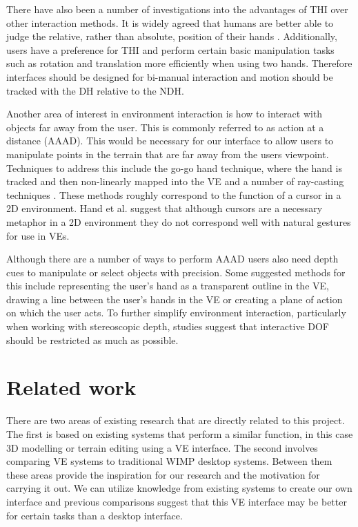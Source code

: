 \documentclass{sig-alternate-05-2015}
\begin{document}
There have also been a number of investigations into the advantages of THI over other interaction methods. It is widely agreed that humans are better able to judge the relative, rather than absolute, position of their hands \cite{Bowman1998, Buxton1986}. Additionally, users have a preference for THI\cite{Buxton1986} and perform certain basic manipulation tasks such as rotation and translation more efficiently when using two hands\cite{Schultheis2012,Balakrishnan1999}. Therefore interfaces should be designed for bi-manual interaction and motion should be tracked with the DH relative to the NDH\cite{Hinckley1994}.

Another area of interest in environment interaction is how to interact with objects far away from the user. This is commonly referred to as action at a distance (AAAD). This would be necessary for our interface to allow users to manipulate points in the terrain that are far away from the users viewpoint. Techniques to address this include the go-go hand technique\cite{Poupyrev1996}, where the hand is tracked and then non-linearly mapped into the VE and a number of ray-casting techniques \cite{Bowman2001}. These methods roughly correspond to the function of a cursor in a 2D environment. Hand et al.\cite{Hand1997} suggest that although cursors are a necessary metaphor in a 2D environment they do not correspond well with natural gestures for use in VEs.

Although there are a number of ways to perform AAAD users also need depth cues to manipulate or select objects with precision.\cite{Schultheis2012} Some suggested methods for this include representing the user's hand as a transparent outline in the VE\cite{Hinckley1994}, drawing a line between the user's hands in the VE\cite{Schultheis2012} or creating a plane of action\cite{Mine2014} on which the user acts. To further simplify environment interaction, particularly when working with stereoscopic depth, studies suggest that interactive DOF should be restricted as much as possible\cite{Bowman2001}.
\section{Related work}
There are two areas of existing research that are directly related to this project. The first is based on existing systems that perform a similar function, in this case 3D modelling or terrain editing using a VE interface. The second involves comparing VE systems to traditional WIMP desktop systems. Between them these areas provide the inspiration for our research and the motivation for carrying it out. We can utilize knowledge from existing systems to create our own interface and previous comparisons suggest that this VE interface may be better for certain tasks than a desktop interface.
\end{document}
